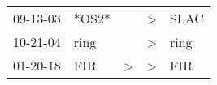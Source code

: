 \begin{supertabular}{p{0.07\textwidth}p{0.06\textwidth}p{0.02\textwidth}p{0.02\textwidth}p{0.06\textwidth}}
 09-13-03\textsuperscript{} &                   *OS2* &               &  \textgreater &  SLAC\textsuperscript{} \\
 10-21-04\textsuperscript{} &  ring\textsuperscript{} &               &  \textgreater &  ring\textsuperscript{} \\
 01-20-18\textsuperscript{} &   FIR\textsuperscript{} &  \textgreater &  \textgreater &   FIR\textsuperscript{} \\
\end{supertabular}
